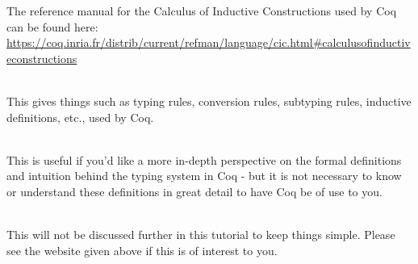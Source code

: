 
The reference manual for the Calculus of Inductive Constructions used by Coq can be found here:
\\
\url{https://coq.inria.fr/distrib/current/refman/language/cic.html#calculusofinductiveconstructions}

~\\
This gives things such as typing rules, conversion rules, subtyping rules, inductive definitions, etc., 
used by Coq. 

~\\
This is useful if you'd like a more in-depth perspective on the formal definitions and intuition behind 
the typing system in Coq - but it is not necessary to know or understand these definitions in great 
detail to have Coq be of use to you. 

~\\
This will not be discussed further in this tutorial to keep things simple. 
Please see the website given above if this is of interest to you. 









